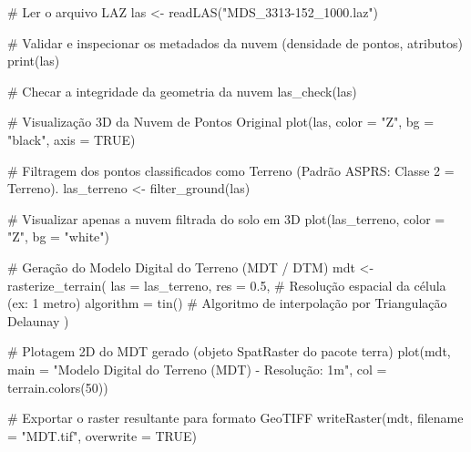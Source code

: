 \documentclass[
  letterpaper,
  DIV=11,
  numbers=noendperiod]{scrreprt}
\newenvironment{Shaded}{\begin{snugshade}}{\end{snugshade}}
\newcommand{\AttributeTok}[1]{\textcolor[rgb]{0.40,0.45,0.13}{#1}}
\newcommand{\CommentTok}[1]{\textcolor[rgb]{0.37,0.37,0.37}{#1}}
\newcommand{\ConstantTok}[1]{\textcolor[rgb]{0.56,0.35,0.01}{#1}}
\newcommand{\DecValTok}[1]{\textcolor[rgb]{0.68,0.00,0.00}{#1}}
\newcommand{\FloatTok}[1]{\textcolor[rgb]{0.68,0.00,0.00}{#1}}
\newcommand{\FunctionTok}[1]{\textcolor[rgb]{0.28,0.35,0.67}{#1}}
\newcommand{\NormalTok}[1]{\textcolor[rgb]{0.00,0.23,0.31}{#1}}
\newcommand{\OtherTok}[1]{\textcolor[rgb]{0.00,0.23,0.31}{#1}}
\newcommand{\StringTok}[1]{\textcolor[rgb]{0.13,0.47,0.30}{#1}}
\begin{document}
\begin{Shaded}
\begin{Highlighting}[]
\CommentTok{\# Ler o arquivo LAZ }
\NormalTok{las }\OtherTok{\textless{}{-}} \FunctionTok{readLAS}\NormalTok{(}\StringTok{"MDS\_3313{-}152\_1000.laz"}\NormalTok{) }

\CommentTok{\# Validar e inspecionar os metadados da nuvem (densidade de pontos, atributos) }
\FunctionTok{print}\NormalTok{(las) }

\CommentTok{\# Checar a integridade da geometria da nuvem }
\FunctionTok{las\_check}\NormalTok{(las) }

\CommentTok{\# Visualização 3D da Nuvem de Pontos Original }
\FunctionTok{plot}\NormalTok{(las, }\AttributeTok{color =} \StringTok{"Z"}\NormalTok{, }\AttributeTok{bg =} \StringTok{"black"}\NormalTok{, }\AttributeTok{axis =} \ConstantTok{TRUE}\NormalTok{) }

\CommentTok{\# Filtragem dos pontos classificados como Terreno (Padrão ASPRS: Classe 2 = Terreno).}
\NormalTok{las\_terreno }\OtherTok{\textless{}{-}} \FunctionTok{filter\_ground}\NormalTok{(las) }

\CommentTok{\# Visualizar apenas a nuvem filtrada do solo em 3D }
\FunctionTok{plot}\NormalTok{(las\_terreno, }\AttributeTok{color =} \StringTok{"Z"}\NormalTok{, }\AttributeTok{bg =} \StringTok{"white"}\NormalTok{) }

\CommentTok{\# Geração do Modelo Digital do Terreno (MDT / DTM) }
\NormalTok{mdt }\OtherTok{\textless{}{-}} \FunctionTok{rasterize\_terrain}\NormalTok{( }
  \AttributeTok{las =}\NormalTok{ las\_terreno, }
  \AttributeTok{res =} \FloatTok{0.5}\NormalTok{, }\CommentTok{\# Resolução espacial da célula (ex: 1 metro) }
  \AttributeTok{algorithm =} \FunctionTok{tin}\NormalTok{() }\CommentTok{\# Algoritmo de interpolação por Triangulação Delaunay }
\NormalTok{  ) }

\CommentTok{\# Plotagem 2D do MDT gerado (objeto SpatRaster do pacote \textquotesingle{}terra\textquotesingle{}) }
\FunctionTok{plot}\NormalTok{(mdt, }\AttributeTok{main =} \StringTok{"Modelo Digital do Terreno (MDT) {-} Resolução: 1m"}\NormalTok{, }\AttributeTok{col =} \FunctionTok{terrain.colors}\NormalTok{(}\DecValTok{50}\NormalTok{)) }

\CommentTok{\# Exportar o raster resultante para formato GeoTIFF }
\FunctionTok{writeRaster}\NormalTok{(mdt, }\AttributeTok{filename =} \StringTok{"MDT.tif"}\NormalTok{, }\AttributeTok{overwrite =} \ConstantTok{TRUE}\NormalTok{)}
\end{Highlighting}
\end{Shaded}
\end{document}
